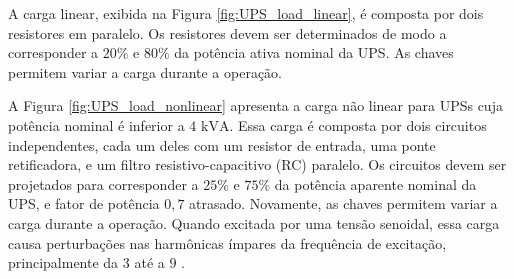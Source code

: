 \documentclass[repeatfields,oneside,overleaf]{tcc}
\begin{document}
A carga linear, exibida na Figura \ref{fig:UPS_load_linear}, é composta por dois resistores em paralelo.
Os resistores devem ser determinados de modo a corresponder a $20 \%$ e $80 \%$ da potência ativa nominal da UPS.
As chaves permitem variar a carga durante a operação.


A Figura \ref{fig:UPS_load_nonlinear} apresenta a carga não linear para UPSs cuja potência nominal é inferior a $4 \text{ kVA}$.
Essa carga é composta por dois circuitos independentes, cada um deles com um resistor de entrada, uma ponte retificadora, e um filtro resistivo-capacitivo (RC) paralelo.
Os circuitos devem ser projetados para corresponder a $25 \%$ e $75 \%$ da potência aparente nominal da UPS, e fator de potência $0,7$ atrasado.
Novamente, as chaves permitem variar a carga durante a operação.
Quando excitada por uma tensão senoidal, essa carga causa perturbações nas harmônicas ímpares da frequência de excitação, principalmente da 3{\textordfeminine} até a 9{\textordfeminine} \cite{Pereira2014, Bertoldi2019}.

\end{document}
